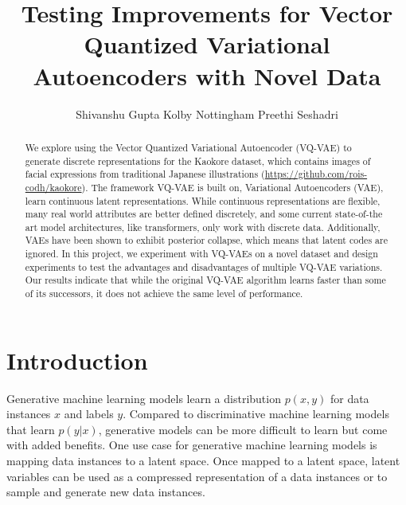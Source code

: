 \documentclass{article}
\title{Testing Improvements for Vector Quantized Variational Autoencoders with Novel Data}
\author{
  Shivanshu Gupta
  \And
  Kolby Nottingham
  \And
  Preethi Seshadri
}
\begin{document}
\maketitle

\begin{abstract}
    We explore using the Vector Quantized Variational Autoencoder (VQ-VAE) to generate discrete representations for the Kaokore dataset, which contains images of facial expressions from traditional Japanese illustrations (\url{https://github.com/rois-codh/kaokore}).
    The framework VQ-VAE is built on, Variational Autoencoders (VAE), learn continuous latent representations.
    While continuous representations are flexible, many real world attributes are better defined discretely, and some current state-of-the art model architectures, like transformers, only work with discrete data. Additionally, VAEs have been shown to exhibit posterior collapse, which means that latent codes are ignored. 
    In this project, we experiment with VQ-VAEs on a novel dataset and design experiments to test the advantages and disadvantages of multiple VQ-VAE variations.
    Our results indicate that while the original VQ-VAE algorithm learns faster than some of its successors, it does not achieve the same level of performance. 
\end{abstract}

\section{Introduction}

Generative machine learning models learn a distribution $p(x,y)$ for data instances $x$ and labels $y$. Compared to discriminative machine learning models that learn $p(y|x)$, generative models can be more difficult to learn but come with added benefits. One use case for generative machine learning models is mapping data instances to a latent space. Once mapped to a latent space, latent variables can be used as a compressed representation of a data instances or to sample and generate new data instances.
\end{document}
